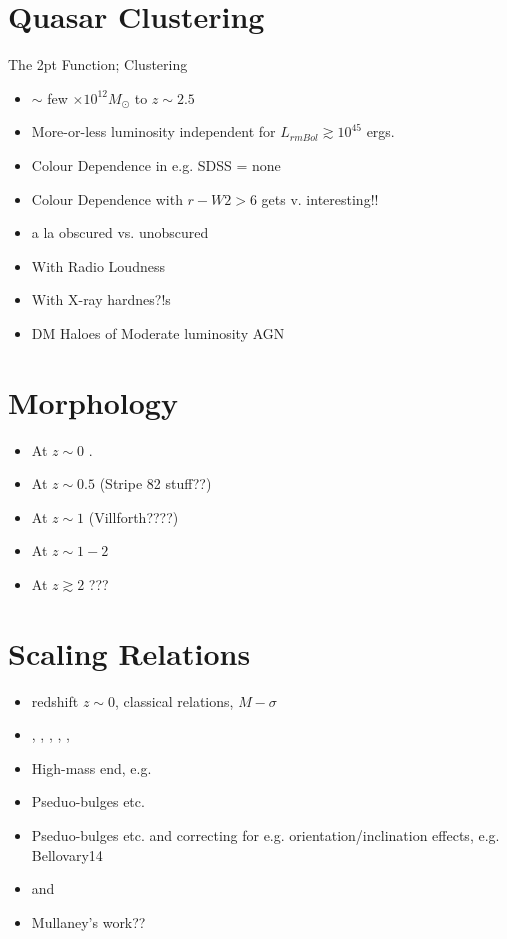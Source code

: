 \documentclass[usenatbib]{mn2e}
\begin{document}
\section{Quasar Clustering} %
The 2pt Function; Clustering
\begin{itemize}
    \item{$\sim$ few $\times10^{12} M_{\odot}$ to $z\sim2.5$}
    \item{More-or-less luminosity independent for $L_{rm Bol} \gtrsim10^{45}$ ergs.}
    \item{Colour Dependence in e.g. SDSS = none}
    \item{Colour Dependence with $r-W2>6$ gets v. interesting!!}
    \item{a la obscured vs. unobscured}
    \item{With Radio Loudness}
    \item{With X-ray hardnes?!s}
      \item{DM Haloes of Moderate luminosity AGN}
\end{itemize}


\section{Morphology} %
\begin{itemize}
    \item{At $z\sim0$ \citet{Bahcall97}.}
    \item{At $z\sim0.5$ (Stripe 82 stuff??)}
    \item{At $z\sim1$ (Villforth????)}
    \item{At $z\sim1-2$ }
    \item{At $z\gtrsim2$ ???}
\end{itemize}

\section{Scaling Relations} %
\begin{itemize}
    \item{redshift $z\sim0$, classical relations, $M-\sigma$}
      \item{ \citet{Faber97}, \citet{Magorrian98}, \citet{Ferrarese00}, \citet{Gebhardt00}, \citet{Tremaine02}, \citet{Gultekin09} }
    \item{High-mass end, e.g. \citet{McConnell11, McConnell13}}
    \item{Pseduo-bulges etc. }
    \item{Pseduo-bulges etc. and correcting for e.g. orientation/inclination effects, 
e.g. Bellovary14 }
    \item{\citet{Tremaine02} and \citet{Novak13}}
    \item{Mullaney's work??}
\end{itemize}
\end{document}
